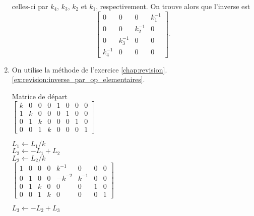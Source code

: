 \begin{exercice}
\begin{sol}
\begin{enumerate}
      celles-ci par $k_4$, $k_3$, $k_2$ et $k_1$, respectivement. On
      trouve alors que l'inverse est
      \begin{displaymath}
        \begin{bmatrix}
          0 & 0 & 0 & k_1^{-1} \\
          0 & 0 & k_2^{-1} & 0 \\
          0 & k_3^{-1} & 0 & 0 \\
          k_4^{-1} & 0 & 0 & 0
        \end{bmatrix}.
      \end{displaymath}
    \item On utilise la méthode de l'exercice
      \ref{chap:revision}.\ref{ex:revision:inverse_par_op_elementaires}.
      \setlength{\ocolumnsep}{\columnsep}
      \setlength{\columnsep}{-86pt}
      \begin{multicols}{2}
        Matrice de départ \\
        \columnbreak
        $%
        \left[
          \begin{array}{rrrr|rrrr}
            k & 0 & 0 & 0 & 1 & 0 & 0 & 0 \\
            1 & k & 0 & 0 & 0 & 1 & 0 & 0 \\
            0 & 1 & k & 0 & 0 & 0 & 1 & 0 \\
            0 & 0 & 1 & k & 0 & 0 & 0 & 1
          \end{array}
        \right]
        $
      \end{multicols}
      \begin{multicols}{2}
        $L_1 \leftarrow L_1/k$ \\
        $L_2 \leftarrow - L_1 + L_2$ \\
        $L_2 \leftarrow L_2/k$ \\
        \columnbreak
        $%
        \left[
          \begin{array}{rrrr|rrrr}
            1 & 0 & 0 & 0 &  k^{-1} &     0 & 0 & 0 \\
            0 & 1 & 0 & 0 & -k^{-2} & k^{-1} & 0 & 0 \\
            0 & 1 & k & 0 &       0 &     0 & 1 & 0 \\
            0 & 0 & 1 & k &       0 &     0 & 0 & 1
          \end{array}
        \right]
        $
      \end{multicols}
      \begin{multicols}{2}
        $L_3 \leftarrow - L_2 + L_3$ \\

\end{multicols}
\end{enumerate}
\end{sol}
\end{exercice}
